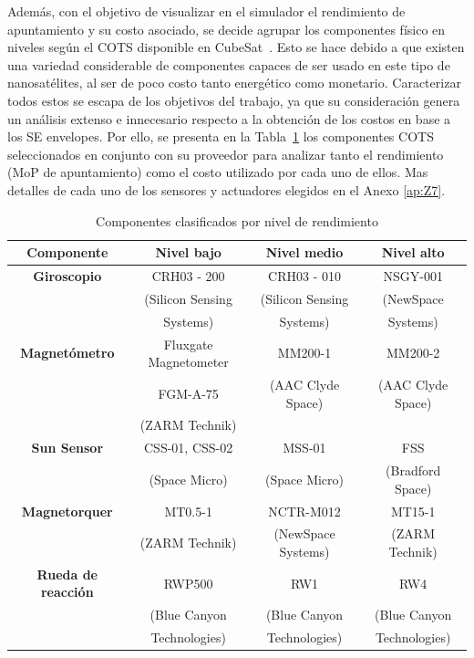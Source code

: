 Además, con el objetivo de visualizar en el simulador el rendimiento de apuntamiento y su costo asociado, se decide agrupar los componentes físico en niveles según el \gls{COTS} disponible en CubeSat~\cite{ref45}. Esto se hace debido a que existen una variedad considerable de componentes capaces de ser usado en este tipo de nanosatélites, al ser de poco costo tanto energético como monetario. Caracterizar todos estos se escapa de los objetivos del trabajo, ya que su consideración genera un análisis extenso e innecesario respecto a la obtención de los costos en base a los SE envelopes. Por ello, se presenta en la Tabla~\ref{tab:niveles} los componentes \gls{COTS} seleccionados en conjunto con su proveedor para analizar tanto el rendimiento (MoP de apuntamiento) como el costo utilizado por cada uno de ellos. Mas detalles de cada uno de los sensores y actuadores elegidos en el Anexo \ref{ap:Z7}.

\begin{table}[h!]
	\centering
	\caption{Componentes clasificados por nivel de rendimiento}
	\begin{tabular}{|c|c|c|c|}
		\hline
		\textbf{Componente}   & \textbf{Nivel bajo} & \textbf{Nivel medio} & \textbf{Nivel alto} \\ 
		\hline
		\textbf{Giroscopio}   & CRH03 - 200  & CRH03 - 010  & NSGY-001   \\
		& (Silicon Sensing  & (Silicon Sensing & (NewSpace \\
		& Systems) & Systems) & Systems) \\
		\hline
		\textbf{Magnetómetro} & Fluxgate Magnetometer & MM200-1 & MM200-2  \\
		& FGM-A-75 & (AAC Clyde Space) & (AAC Clyde Space) \\
		& (ZARM Technik) & & \\
		\hline
		\textbf{Sun Sensor}   & CSS-01, CSS-02  & MSS-01 & FSS  \\
		& (Space Micro)   & (Space Micro) & (Bradford Space) \\
		\hline
		\textbf{Magnetorquer} & MT0.5-1 & NCTR-M012 & MT15-1 \\
		& (ZARM Technik) & (NewSpace Systems) & (ZARM Technik) \\
		\hline
		\textbf{Rueda de reacción} & RWP500 & RW1  & RW4  \\
		& (Blue Canyon & (Blue Canyon & (Blue Canyon \\
		& Technologies) & Technologies) & Technologies) \\
		\hline
	\end{tabular}
	\label{tab:niveles}
\end{table}


